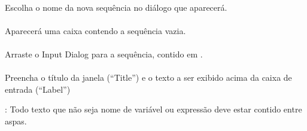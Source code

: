 \documentclass[letterpaper,10pt,brazil]{sphinxmanual}
\begin{document}
\paragraph{}
\label{\detokenize{exercise_1:ii-escolha-o-nome-da-nova-sequencia}}
Escolha o nome da nova sequência no diálogo que aparecerá.

\begin{figure}[htbp]
\centering

\noindent{}
\end{figure}


\paragraph{}
\label{\detokenize{exercise_1:iii-sequencia-vazia}}
Aparecerá uma caixa contendo a sequência vazia.

\begin{figure}[htbp]
\centering

\noindent{}
\end{figure}


\paragraph{}
\label{\detokenize{exercise_1:iv-insira-input-dialog-na-sequencia}}
Arraste o Input Dialog para a sequência, contido em .

\begin{figure}[htbp]
\centering

\noindent{}
\end{figure}


\paragraph{}
\label{\detokenize{exercise_1:v-preencha-o-input-dialog}}
Preencha o título da janela (“Title”) e o texto a ser exibido acima da caixa de entrada (“Label”)

: Todo texto que não seja nome de variável ou expressão deve estar contido entre aspas.
\end{document}

